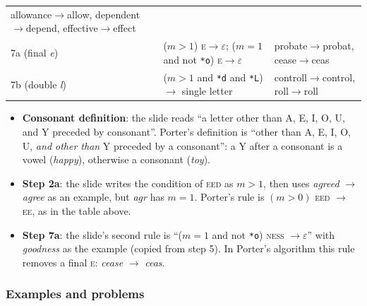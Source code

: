 \begin{center}
\begin{tabularx}{\linewidth}{@{}>{\raggedright\arraybackslash}p{1.9cm} >{\raggedright\arraybackslash}X >{\raggedright\arraybackslash}X@{}}
  allowance$\to$allow, dependent$\to$depend, effective$\to$effect \\
\addlinespace
7a (final \emph{e}) & ($m{>}1$) \textsc{e}$\to\varepsilon$;\;
  ($m{=}1$ and not \texttt{*o}) \textsc{e}$\to\varepsilon$ & probate$\to$probat,
  cease$\to$ceas \\
\addlinespace
7b (double \emph{l}) & ($m{>}1$ and \texttt{*d} and \texttt{*L}) $\to$ single letter &
  controll$\to$control, roll$\to$roll \\
\bottomrule
\end{tabularx}
\end{center}

\begin{nbwarning}
\begin{itemize}[nosep]
  \item \textbf{Consonant definition}: the slide reads ``a letter other than A, E, I, O,
        U, and Y preceded by consonant''. Porter's definition is ``other than A, E, I, O,
        U, \emph{and other than} Y preceded by a consonant'': a Y after a consonant is a
        vowel (\emph{happy}), otherwise a consonant (\emph{toy}).
  \item \textbf{Step 2a}: the slide writes the condition of \textsc{eed} as $m>1$, then
        uses \emph{agreed} $\to$ \emph{agree} as an example, but \emph{agr} has $m=1$.
        Porter's rule is $(m>0)$ \textsc{eed} $\to$ \textsc{ee}, as in the table above.
  \item \textbf{Step 7a}: the slide's second rule is ``($m{=}1$ and not \texttt{*o})
        \textsc{ness} $\to \varepsilon$'' with \emph{goodness} as the example (copied
        from step 5). In Porter's algorithm this rule removes a final \textsc{e}:
        \emph{cease} $\to$ \emph{ceas}.
\end{itemize}
\end{nbwarning}

\subsubsection{Examples and problems}

